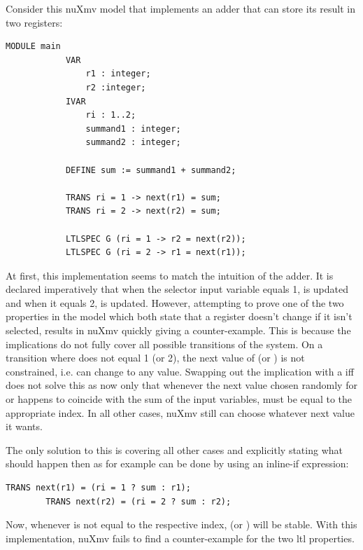 \begin{example}
    Consider this nuXmv model that implements an adder that can store its result in two registers:
    \begin{lstlisting}[language=smv]
        MODULE main
            VAR
                r1 : integer;
                r2 :integer;
            IVAR
                ri : 1..2;
                summand1 : integer;
                summand2 : integer;

            DEFINE sum := summand1 + summand2;

            TRANS ri = 1 -> next(r1) = sum;
            TRANS ri = 2 -> next(r2) = sum;

            LTLSPEC G (ri = 1 -> r2 = next(r2));
            LTLSPEC G (ri = 2 -> r1 = next(r1));
    \end{lstlisting}

    At first, this implementation seems to match the intuition of the adder.
    It is declared imperatively that when the selector input variable  equals 1,  is updated and when it equals 2,  is updated.
    However, attempting to prove one of the two properties in the model which both state that a register doesn't change if it isn't selected, results in nuXmv quickly giving a counter-example.
    This is because the implications do not fully cover all possible transitions of the system.
    On a transition where  does not equal 1 (or 2), the next value of  (or ) is not constrained, i.e. can change to any value.
    Swapping out the implication \smv{->} with a iff \smv{<->} does not solve this as now only that whenever the next value chosen randomly for  or  happens to coincide with the sum of the input variables,  must be equal to the appropriate index.
    In all other cases, nuXmv still can choose whatever next value it wants.

    The only solution to this is covering all other cases and explicitly stating what should happen then as for example can be done by using an inline-if expression:
    \begin{lstlisting}[language=smv]
        TRANS next(r1) = (ri = 1 ? sum : r1);
        TRANS next(r2) = (ri = 2 ? sum : r2);
    \end{lstlisting}

    Now, whenever  is not equal to the respective index,  (or ) will be stable.
    With this implementation, nuXmv fails to find a counter-example for the two \gls{ltl} properties.
\end{example}

